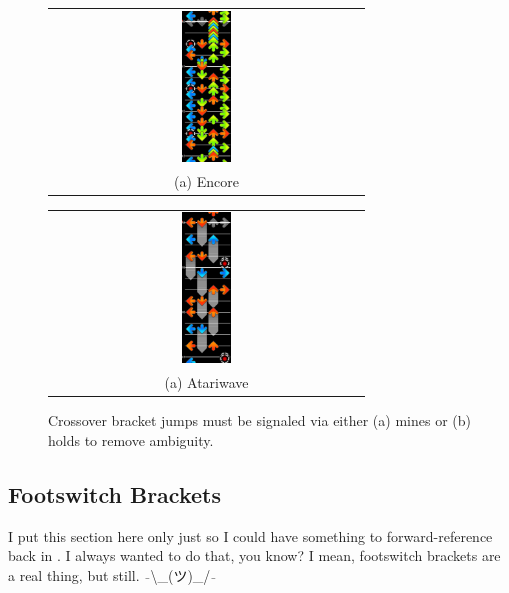 \documentclass[10pt]{sigplanconf}
\begin{document}
\begin{figure}[t]
	\begin{center}
	\begin{tabular}{c}
		\includegraphics[width=0.16\textwidth]{xb-encore.png}
		\\
		(a) Encore \cite{encore} %
	\end{tabular}
	\quad
	\begin{tabular}{c}
		\includegraphics[width=0.16\textwidth]{xb-atariwave.png}
		\\
		(a) Atariwave \cite{atariwave} %
	\end{tabular}
	\end{center}
	\caption{Crossover bracket jumps must be signaled via either (a) mines or (b) holds to remove ambiguity.}
	\label{fig:xb}
\end{figure}

\subsection{Footswitch Brackets}
\label{sec:fs-brackers}

I put this section here only just so I could have something to forward-reference back in .
I always wanted to do that, you know?
I mean, footswitch brackets are %
a real thing, but still. $\bar{~~}$\textbackslash\_(ツ)\_/$\bar{~~}$
\end{document}
